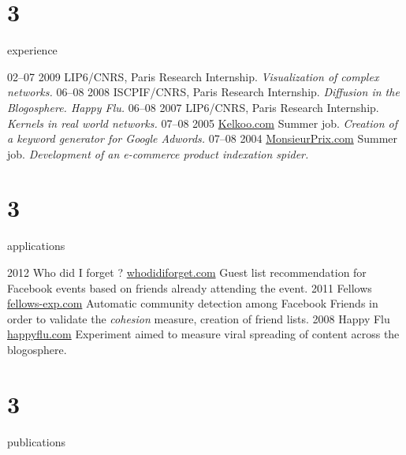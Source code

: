 \documentclass[]{friggeri-cv}
\begin{document}
\section{3}{experience}

\begin{entrylist}
  \entry
    {02–07 2009}
    {LIP6/CNRS, Paris}
    {Research Internship.}
    {\emph{Visualization of complex networks.}}
  \entry
    {06–08 2008}
    {ISCPIF/CNRS, Paris}
    {Research Internship.}
    {\emph{Diffusion in the Blogosphere. Happy Flu.}}
  \entry
    {06–08 2007}
    {LIP6/CNRS, Paris}
    {Research Internship.}
    {\emph{Kernels in real world networks.}}
  \entry
    {07–08 2005}
    {\href{http://www.kelkoo.com}{Kelkoo.com}}
    {Summer job.}
    {\emph{Creation of a keyword generator for Google Adwords.}}
  \entry
    {07–08 2004}
    {\href{http://www.monsieurprix.com}{MonsieurPrix.com}}
    {Summer job.}
    {\emph{Development of an e-commerce product indexation spider.}}
\end{entrylist}

\section{3}{applications}

\begin{entrylist}
  \entry
    {2012}
    {Who did I forget ?}
    {\href{http://whodidiforget.com}{whodidiforget.com}}
    {Guest list recommendation for Facebook events based on friends already attending the event.}
  \entry
    {2011}
    {Fellows}
    {\href{http://fellows-exp.com}{fellows-exp.com}}
    {Automatic community detection among Facebook Friends in order to validate the \emph{cohesion} measure, creation of friend lists.}
  \entry
    {2008}
    {Happy Flu}
    {\href{http://happyflu.com}{happyflu.com}}
    {Experiment aimed to measure viral spreading of content across the blogosphere.}
\end{entrylist}

\section{3}{publications}


\begin{refsection}
  \nocite{*}
  \printbibliography[sorting=chronological, type=inproceedings, title={international peer-reviewed conferences/proceedings}, notkeyword={france}, heading=subbibliography]
\end{refsection}
\begin{refsection}
  \nocite{*}
  \printbibliography[sorting=chronological, type=inproceedings, title={local peer-reviewed conferences/proceedings}, keyword={france}, heading=subbibliography]
\end{refsection}
\end{document}

